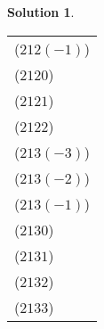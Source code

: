 \documentclass[10pt]{article}
\theoremstyle{definition}
\newtheorem{soln}{Solution}
\begin{document}
\begin{soln}
\begin{table}[h!]
\begin{tabular}{l}
      ($21 2 (-1)$) \\
      ($21 2 0$)    \\
      ($21 2 1$)    \\
      ($21 2 2$)    \\
      ($21 3 (-3)$) \\
      ($21 3 (-2)$) \\
      ($21 3 (-1)$) \\
      ($21 3 0$)    \\
      ($21 3 1$)    \\
      ($21 3 2$)    \\
      ($21 3 3$)    \\
      \bottomrule
    \end{tabular}
  \end{table}

\end{soln}
\newpage
\end{document}
